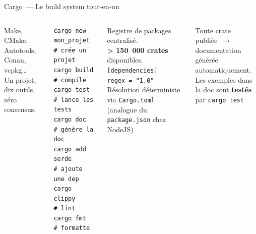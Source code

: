 \documentclass[aspectratio=169, 10pt]{beamer}
\newcommand{\bash}[1]{\texttt{#1}}
\begin{document}
\begin{frame}[fragile]{Cargo~--- Le build system tout-en-un}
  \begin{columns}[t]
    \begin{tcolorbox}[dangerbox, title={En C~: l'enfer de configuration}]
      \small Make, CMake, Autotools, Conan, vcpkg\ldots\\
      Un projet, dix outils, zéro consensus.
    \end{tcolorbox}
    \vspace{0.3em}
    \begin{tcolorbox}[safebox, title={\faRust\ En Rust~: un seul outil}]
      \color{white}
      \begin{verbatim}
cargo new mon_projet  # crée un projet
cargo build           # compile
cargo test            # lance les tests
cargo doc             # génère la doc
cargo add serde       # ajoute une dep
cargo clippy          # lint
cargo fmt             # formatte
      \end{verbatim}
    \end{tcolorbox}

    \begin{tcolorbox}[notebox, title={\faBoxOpen\ crates.io}]
      \small Registre de packages centralisé.\\
      \textbf{> 150~000 crates} disponibles.\\[0.3em]
      \texttt{[dependencies]}\\
      \texttt{regex = "1.0"}\\[0.3em]
      Résolution déterministe via \texttt{Cargo.toml} (analogue du \texttt{package.json} chez NodeJS)
    \end{tcolorbox}
    \vspace{0.3em}
    \begin{tcolorbox}[safebox, title={\faBook\ docs.rs}]
      \small Toute crate publiée~$\to$ documentation générée automatiquement.\\
      Les exemples dans la doc sont \textbf{testés} par \color{white} \bash{cargo test}
    \end{tcolorbox}
  \end{columns}
\end{frame}
\end{document}
